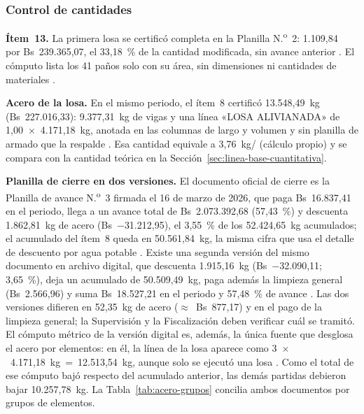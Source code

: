\subsubsection{Control de cantidades}
\textbf{Ítem~13.} La primera losa se certificó completa en la Planilla N.\textsuperscript{o}~2: 1.109,84~\mdos{} por Bs~239.365,07, el 33,18~\% de la cantidad modificada, sin avance anterior \parencite[p.~16]{uatf2025pao2}. El cómputo lista los 41 paños solo con su área, sin dimensiones ni cantidades de materiales \parencite[pp.~28--29]{uatf2025pao2}.

\textbf{Acero de la losa.} En el mismo periodo, el ítem~8 certificó 13.548,49~kg (Bs~227.016,33): 9.377,31~kg de vigas y una línea «LOSA ALIVIANADA» de 1,00~$\times$~4.171,18~kg, anotada en las columnas de largo y volumen y sin planilla de armado que la respalde \parencite[pp.~19--20]{uatf2025pao2}. Esa cantidad equivale a 3,76~kg/\mdos{} (cálculo propio) y se compara con la cantidad teórica en la Sección~\ref{sec:linea-base-cuantitativa}.

\textbf{Planilla de cierre en dos versiones.} El documento oficial de cierre es la Planilla de avance N.\textsuperscript{o}~3 firmada el 16 de marzo de 2026, que paga Bs~16.837,41 en el periodo, llega a un avance total de Bs~2.073.392,68 (57,43~\%) y descuenta 1.862,81~kg de acero (Bs~$-$31.212,95), el 3,55~\% de los 52.424,65~kg acumulados; el acumulado del ítem~8 queda en 50.561,84~kg, la misma cifra que usa el detalle de descuento por agua potable \parencite[pp.~2, 12]{uatf_item13}. Existe una segunda versión del mismo documento en archivo digital, que descuenta 1.915,16~kg (Bs~$-$32.090,11; 3,65~\%), deja un acumulado de 50.509,49~kg, paga además la limpieza general (Bs~2.566,96) y suma Bs~18.527,21 en el periodo y 57,48~\% de avance \parencite{uatf_pao3}. Las dos versiones difieren en 52,35~kg de acero ($\approx$~Bs~877,17) y en el pago de la limpieza general; la Supervisión y la Fiscalización deben verificar cuál se tramitó. El cómputo métrico de la versión digital es, además, la única fuente que desglosa el acero por elementos: en él, la línea de la losa aparece como 3~$\times$~4.171,18~kg~=~12.513,54~kg, aunque solo se ejecutó una losa \parencite[hoja «Cómputos métricos», filas 375--541]{uatf_pao3}. Como el total de ese cómputo bajó respecto del acumulado anterior, las demás partidas debieron bajar 10.257,78~kg. La Tabla~\ref{tab:acero-grupos} concilia ambos documentos por grupos de elementos.

